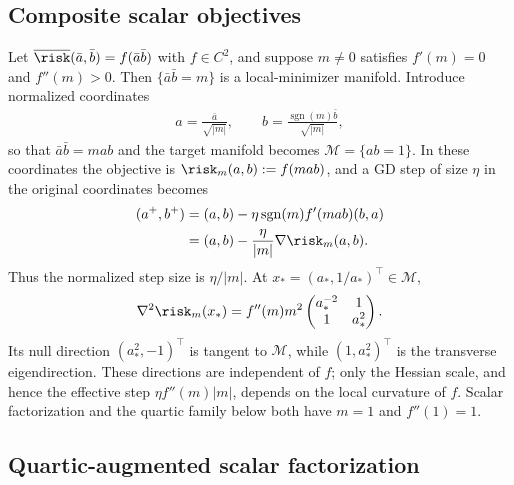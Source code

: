 \documentclass{article}
\begin{document}
\subsection{Composite scalar objectives}
\label{subsec:model_catalog_composite_scalar}

Let
$\overline\risk(\bar a,\bar b)=f(\bar a\bar b)$ with $f\in C^2$, and suppose
$m\ne0$ satisfies $f'(m)=0$ and $f''(m)>0$. Then
$\{\bar a\bar b=m\}$ is a local-minimizer manifold. Introduce normalized
coordinates
\begin{align}
    a=\frac{\bar a}{\sqrt{|m|}},
    \qquad
    b=\frac{\operatorname{sgn}(m)\bar b}{\sqrt{|m|}},
    \label{eq:model_catalog_composite_rescaling}
\end{align}
so that $\bar a\bar b=mab$ and the target manifold becomes
$\mathcal M=\{ab=1\}$. In these coordinates the objective is
$\risk_m(a,b):=f(mab)$, and a GD step of size $\eta$ in the original
coordinates becomes
\begin{align}
    (a^+,b^+)
    &=(a,b)-\eta\operatorname{sgn}(m)f'(mab)(b,a) \\
    &=(a,b)-\frac{\eta}{|m|}\nabla\risk_m(a,b).
    \label{eq:model_catalog_composite_gd}
\end{align}
Thus the normalized step size is $\eta/|m|$. At
$x_*=(a_*,1/a_*)^\top\in\mathcal M$,
\begin{align}
    \nabla^2\risk_m(x_*)
    =
    f''(m)m^2
    \begin{pmatrix}
        a_*^{-2} & 1 \\
        1 & a_*^2
    \end{pmatrix}.
    \label{eq:model_catalog_composite_hessian}
\end{align}
Its null direction $(a_*^2,-1)^\top$ is tangent to $\mathcal M$, while
$(1,a_*^2)^\top$ is the transverse eigendirection. These directions are
independent of $f$; only the Hessian scale, and hence the effective step
$\eta f''(m)|m|$, depends on the local curvature of $f$. Scalar factorization
and the quartic family below both have $m=1$ and $f''(1)=1$.

\subsection{Quartic-augmented scalar factorization}
\label{subsec:model_catalog_quartic}
\end{document}
